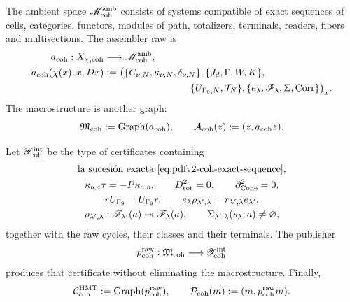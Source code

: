 The ambient space \(\mathscr M_{\rm coh}^{\rm amb}\) consists of systems
compatible of exact sequences of cells, categories, functors, modules of
path, totalizers, terminals, readers, fibers and multisections. The
assembler raw is
\begin{equation}\label{eq:pdfv2-coh-assembler}
 \begin{aligned}
 a_{\rm coh}:X_{\chi,{\rm coh}}&\longrightarrow
 \mathscr M_{\rm coh}^{\rm amb},\\
 a_{\rm coh}(\chi(x),x,Dx)
 &:={}
 \bigl(
 \{C_{\nu,N},\kappa_{\nu,N},\delta_{\nu,N}\},
 \{J_d,\Gamma,W,K\},\\
 &\hspace{31mm}
 \{U_{\Gamma_9,N},\mathcal T_N\},
 \{e_\lambda,\mathscr F_\lambda,\Sigma,\operatorname{Corr}\}
 \bigr)_x.
 \end{aligned}
\end{equation}
The macrostructure is another graph:
\begin{equation}\label{eq:pdfv2-coh-macro-graph}
 \mathfrak M_{\rm coh}:=\operatorname{Graph}(a_{\rm coh}),
 \qquad
 \mathcal A_{\rm coh}(z):=(z,a_{\rm coh}z).
\end{equation}

Let \(\mathscr Y_{\rm coh}^{\rm int}\) be the type of certificates containing
\begin{equation}\label{eq:pdfv2-coh-certificate-list}
 \begin{gathered}
 \text{la sucesión exacta \eqref{eq:pdfv2-coh-exact-sequence}},\\
 \kappa_{b,a}\tau=-P\kappa_{a,b},
 \qquad D_{\rm tot}^2=0,
 \qquad\partial_{\rm Cone}^2=0,\\
 rU_{\Gamma_9}=U_{\Gamma_9}r,
 \qquad
 e_\lambda\rho_{\lambda',\lambda}
 =r_{\lambda',\lambda}e_{\lambda'},\\
 \rho_{\lambda',\lambda}:\mathscr F_{\lambda'}(a)
 \twoheadrightarrow\mathscr F_\lambda(a),
 \qquad
 \Sigma_{\lambda',\lambda}(s_\lambda;a)\neq\varnothing,
 \end{gathered}
\end{equation}
together with the raw cycles, their classes and their terminals. The publisher
\begin{equation}\label{eq:pdfv2-coh-publisher}
 p_{\rm coh}^{\rm raw}:\mathfrak M_{\rm coh}
 \longrightarrow\mathscr Y_{\rm coh}^{\rm int}
\end{equation}
produces that certificate without eliminating the macrostructure. Finally,
\begin{equation}\label{eq:pdfv2-coh-output-graph}
 \mathcal C_{\rm coh}^{\rm HMT}
 :=\operatorname{Graph}(p_{\rm coh}^{\rm raw}),
 \qquad
 \mathcal P_{\rm coh}(m):=(m,p_{\rm coh}^{\rm raw}m).
\end{equation}

